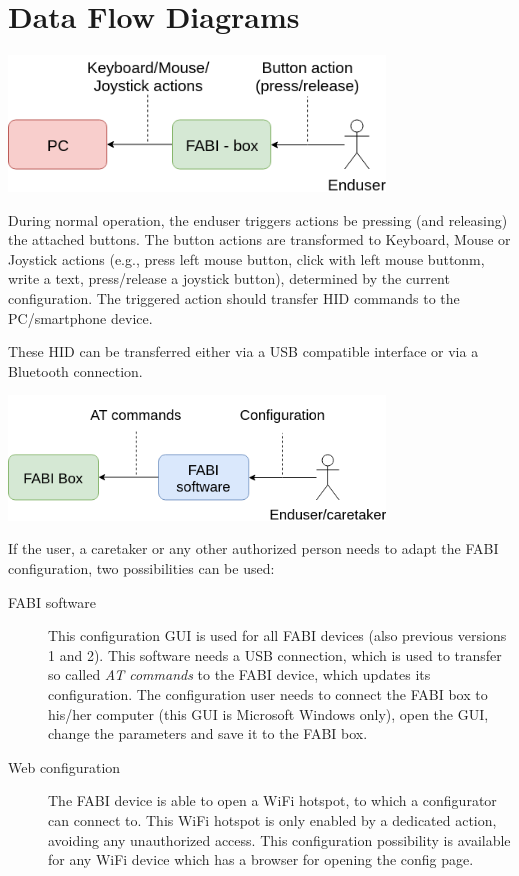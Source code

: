 \documentclass[]{scrreprt}%
\begin{document}
\section{Data Flow Diagrams}

\begin{center}
\includegraphics[width=100mm]{data_flow_fabi_normal.png} 
\end{center}

During normal operation, the enduser triggers actions be pressing (and releasing) the attached buttons. The button actions
are transformed to Keyboard, Mouse or Joystick actions (e.g., press left mouse button, click with left mouse buttonm, write a text,
press/release a joystick button), determined by the current configuration. The triggered action should transfer HID commands to the PC/smartphone device. 

These HID can be transferred either via a USB compatible interface or via a Bluetooth connection.

\begin{center}
\includegraphics[width=100mm]{data_flow_fabi_config.png} 
\end{center}

If the user, a caretaker or any other authorized person needs to adapt the FABI configuration, two possibilities can be used:
\begin{description}
 \item[FABI software] This configuration GUI is used for all FABI devices (also previous versions 1 and 2). This software needs a USB connection, which is used to transfer so called \textit{AT commands} to the FABI device, which updates its configuration. The configuration
 user needs to connect the FABI box to his/her computer (this GUI is Microsoft Windows only), open the GUI, change the parameters and save it
 to the FABI box.
 \item[Web configuration] The FABI device is able to open a WiFi hotspot, to which a configurator can connect to. This WiFi hotspot is only
 enabled by a dedicated action, avoiding any unauthorized access. This configuration possibility is available for any WiFi device which has 
 a browser for opening the config page.
\end{description}
\end{document}
